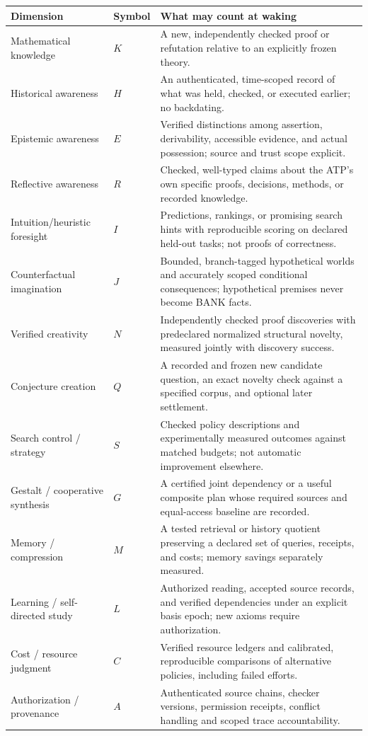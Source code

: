 \documentclass[11pt,letterpaper]{article}
\theoremstyle{definition}
\theoremstyle{plain}
\theoremstyle{definition}
\begin{document}
\begin{center}\small
\begin{tabularx}{\linewidth}{@{}p{.19\linewidth}p{.10\linewidth}X@{}}\toprule
Dimension & Symbol & What may count at waking\\\midrule
Mathematical knowledge & $K$ & A new, independently checked proof or refutation relative to an explicitly frozen theory.\\
Historical awareness & $H$ & An authenticated, time-scoped record of what was held, checked, or executed earlier; no backdating.\\
Epistemic awareness & $E$ & Verified distinctions among assertion, derivability, accessible evidence, and actual possession; source and trust scope explicit.\\
Reflective awareness & $R$ & Checked, well-typed claims about the ATP's own specific proofs, decisions, methods, or recorded knowledge.\\
Intuition/heuristic foresight & $I$ & Predictions, rankings, or promising search hints with reproducible scoring on declared held-out tasks; not proofs of correctness.\\
Counterfactual imagination & $J$ & Bounded, branch-tagged hypothetical worlds and accurately scoped conditional consequences; hypothetical premises never become BANK facts.\\
Verified creativity & $N$ & Independently checked proof discoveries with predeclared normalized structural novelty, measured jointly with discovery success.\\
Conjecture creation & $Q$ & A recorded and frozen new candidate question, an exact novelty check against a specified corpus, and optional later settlement.\\
Search control / strategy & $S$ & Checked policy descriptions and experimentally measured outcomes against matched budgets; not automatic improvement elsewhere.\\
Gestalt / cooperative synthesis & $G$ & A certified joint dependency or a useful composite plan whose required sources and equal-access baseline are recorded.\\
Memory / compression & $M$ & A tested retrieval or history quotient preserving a declared set of queries, receipts, and costs; memory savings separately measured.\\
Learning / self-directed study & $L$ & Authorized reading, accepted source records, and verified dependencies under an explicit basis epoch; new axioms require authorization.\\
Cost / resource judgment & $C$ & Verified resource ledgers and calibrated, reproducible comparisons of alternative policies, including failed efforts.\\
Authorization / provenance & $A$ & Authenticated source chains, checker versions, permission receipts, conflict handling and scoped trace accountability.\\\bottomrule
\end{tabularx}
\end{center}
\end{document}

